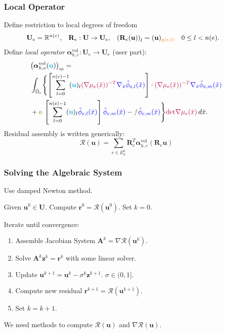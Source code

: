 \begin{frame}
\frametitle{Local Operator}
Define restriction to local degrees of freedom
\begin{align*}
\mathbf{U}_e &= \mathbb{R}^{n(e)}, &
\mathbf{R}_e &: \mathbf{U} \to \mathbf{U}_e, &
\left(\mathbf{R}_e(\mathbf{u})\right)_l &= (\mathbf{u})_{\color{orange}g(e,l)} \quad 0\leq l < n(e).
\end{align*}
Define \textit{local operator} $\bm{\alpha}^{\text{vol}}_{h,e} : \mathbf{U}_e \to \mathbf{U}_e$ (user part):
\begin{equation*}
\begin{split}
&\bigl(\bm{\alpha}^{\text{vol}}_{h,e}({\color{cyan}\mathbf{u}})\bigr)_m  = \\
&\int_{\hat\Omega_e} 
\Biggl\{\left[ \sum_{l=0}^{n(e)-1} ({\color{cyan}\mathbf{u}})_{l} {\color{purple}
(\nabla \mu_e(\hat{x}))^{-T}} {\color{blue}\nabla_{\hat{x}} \hat\phi_{e,l}(\hat{x})} \right]
\cdot {\color{purple}(\nabla \mu_e(\hat{x}))^{-T}} {\color{blue}\nabla_{\hat{x}} \hat\phi_{e,m}(\hat{x})}\\
& + {\color{olive} a} \, \left[ \sum_{l=0}^{n(e)-1} ({\color{cyan}\mathbf{u}})_{l}
 {\color{blue}\hat\phi_{e,l}(\hat{x})} \right] {\color{blue}\hat\phi_{e,m}(\hat{x})}
- {\color{olive} f} {\color{blue}\hat\phi_{e,m}(\hat{x})} \Biggr\} {\color{purple}\text{det} \nabla\mu_e(\hat{x})} \, d\hat{x} .
\end{split}
\end{equation*}
Residual assembly is written generically:
\begin{equation*}
\mathcal{R}(\mathbf{u}) = \sum_{e\in E_h^0} \mathbf{R}_e^T \bm{\alpha}^{\text{vol}}_{h,e} (\mathbf{R}_e \mathbf{u})
\end{equation*}
\end{frame}


\begin{frame}
\frametitle{Solving the Algebraic System}
Use damped Newton method.

Given $\mathbf{u}^0\in\mathbf{U}$. Compute $\mathbf{r}^0 = \mathcal{R}(\mathbf{u}^0)$. Set $k=0$.

Iterate until convergence:
\begin{enumerate}
\item Assemble Jacobian System $\mathbf{A}^k = \nabla\mathcal{R}(\mathbf{u}^k)$.
\item Solve $\mathbf{A}^k \mathbf{z}^k = \mathbf{r}^k$ with some linear solver.
\item Update $\mathbf{u}^{k+1} = \mathbf{u}^{k} - \sigma^k \mathbf{z}^{k+1}$. $\sigma\in(0,1]$.
\item Compute new residual $\mathbf{r}^{k+1} = \mathcal{R}(\mathbf{u}^{k+1})$.
\item Set $k = k +1$.
\end{enumerate}

We need methods to compute $\mathcal{R}(\mathbf{u})$ and $\nabla\mathcal{R}(\mathbf{u})$.
\end{frame}

